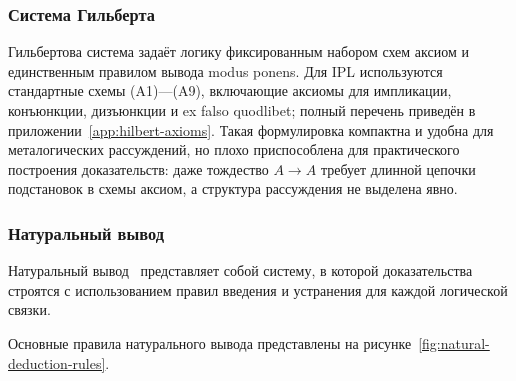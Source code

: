 \documentclass[14pt, russian]{scrartcl}
\begin{document}
\subsubsection{Система Гильберта}

Гильбертова система задаёт логику фиксированным набором схем аксиом и единственным
правилом вывода modus ponens. Для IPL используются стандартные схемы (A1)---(A9),
включающие аксиомы для импликации, конъюнкции, дизъюнкции и ex falso quodlibet;
полный перечень приведён в приложении~\ref{app:hilbert-axioms}. Такая формулировка компактна и удобна для металогических рассуждений, но плохо
приспособлена для практического построения доказательств: даже тождество
$A \rightarrow A$ требует длинной цепочки подстановок в схемы аксиом, а структура
рассуждения не выделена явно.

\subsubsection{Натуральный вывод}

Натуральный вывод~\cite{Gentzen1935} представляет собой систему, в которой доказательства строятся
с использованием правил введения и устранения для каждой логической связки.

Основные правила натурального вывода представлены на рисунке~\ref{fig:natural-deduction-rules}.
\end{document}

